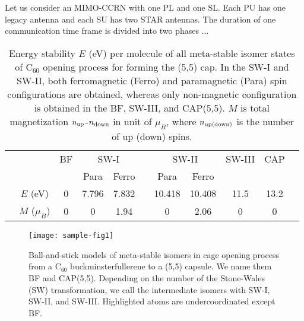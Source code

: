 \documentclass[master,english,final]{kaist-ucs} %
\begin{document}
Let us consider an MIMO-CCRN with one PL and one SL. Each PU has one legacy
antenna and each SU has two STAR antennas. The duration of one communication
time frame is divided into two phases \cite{RVP2,ML2} ...
\begin{table}[t]
	\caption[Enter the caption title here]{Energy stability $E$ (eV) per molecule of all meta-stable
		isomer states of C$_{60}$ opening process for forming the (5,5) cap.
		In the SW-I and SW-II, both ferromagnetic (Ferro) and paramagnetic (Para)
		spin configurations are obtained, whereas only non-magnetic configuration
		is obtained in the BF, SW-III, and CAP(5,5).
		$M$ is total magnetization $n_{\rm up}$-$n_{\rm down}$ in unit of $\mu_B$, where
		$n_{\rm up(down)}$ is the number of up (down) spins.
	}
	\label{mag-tab1}
	\begin{center}
		\begin{tabular} {ccccccccccc}
			\hline\hline
			 &               & BF & \multicolumn{2}{c}{SW-I} &       & \multicolumn{2}{c}{SW-II} & SW-III & CAP    &               \\
			\cline{4-5} \cline{7-8}
			 &               &    & Para                     & Ferro &                           & Para   & Ferro  &      &      & \\
			\hline
			 & $E$ (eV)      & 0  & 7.796                    & 7.832 &                           & 10.418 & 10.408 & 11.5 & 13.2 & \\
			 & $M$ ($\mu_B$) & 0  & 0                        & 1.94  &                           & 0      & 2.06   & 0    & 0    & \\
			\hline\hline
		\end{tabular}
	\end{center}
\end{table}

\begin{figure}[t]
	\centerline{\texttt{[image: sample-fig1]}}
	\caption[Enter the caption title here]{ Ball-and-stick models of meta-stable isomers in
		cage opening process from a C$_{60}$ buckminsterfullerene
		to a (5,5) capsule. We name them BF and CAP(5,5).
		Depending on the number of the Stone-Wales (SW) transformation,
		we call the intermediate isomers with SW-I, SW-II, and SW-III.
		Highlighted atoms are undercoordinated except BF.
	} \label{mag-fig1}
\end{figure}
\end{document}
